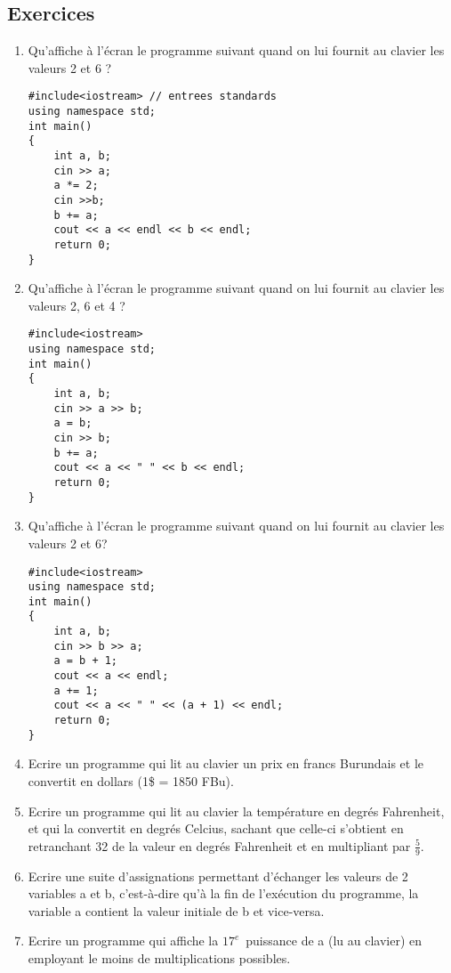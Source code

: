\documentclass[a4paper, oneside,11pt]{book}
\begin{document}
\subsection{Exercices}
\begin{enumerate}
\item Qu'affiche \`a l'\'ecran le programme suivant quand on lui fournit au clavier les valeurs 2 et 6 ?
\begin{lstlisting}
#include<iostream> // entrees standards
using namespace std;
int main()
{
    int a, b;
    cin >> a;
    a *= 2; 
    cin >>b;
    b += a;
    cout << a << endl << b << endl;
    return 0;
}
\end{lstlisting}
\item Qu'affiche \`a l'\'ecran le programme suivant quand on lui fournit au clavier les valeurs 2, 6 et 4 ?
\begin{lstlisting}
#include<iostream> 
using namespace std;
int main()
{
    int a, b;
    cin >> a >> b;
    a = b;
    cin >> b;
    b += a;
    cout << a << " " << b << endl;
    return 0;
}
\end{lstlisting}
\item Qu'affiche \`a l'\'ecran le programme suivant quand on lui fournit au clavier les valeurs 2 et 6?
\begin{lstlisting}
#include<iostream> 
using namespace std;
int main()
{
    int a, b;
    cin >> b >> a;
    a = b + 1;
    cout << a << endl;
    a += 1;
    cout << a << " " << (a + 1) << endl;
    return 0;
}
\end{lstlisting}

\item Ecrire un programme qui lit au clavier un prix en francs Burundais et le convertit en dollars (1\$ = 1850 FBu).
\item Ecrire un programme qui lit au clavier la temp\'erature en degr\'es Fahrenheit, et qui la convertit en degr\'es Celcius, sachant que celle-ci s'obtient en retranchant 32
de la valeur en degr\'es Fahrenheit et en multipliant par $\frac{5}{9}$.
\item Ecrire une suite d'assignations permettant d'\'echanger les valeurs de 2 variables a et b, c'est-\`a-dire qu'\`a la fin de l'ex\'ecution du programme, la variable a contient la 
valeur initiale de b et vice-versa.
\item Ecrire un programme qui affiche la $17^e$\ puissance de a (lu au clavier) en employant le moins de multiplications possibles. 
\end{enumerate}
\end{document}
